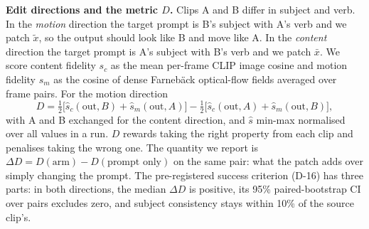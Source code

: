 \documentclass[twoside,english]{article}
\newcommand{\xs}{\bar{x}}         %
\newcommand{\xd}{\tilde{x}}       %
\newcommand{\dD}{\Delta D}
\begin{document}
\textbf{Edit directions and the metric $D$.} Clips A and B differ in subject and verb. In the
\emph{motion} direction the target prompt is B's subject with A's verb and we patch $\xd$, so the
output should look like B and move like A. In the \emph{content} direction the target prompt is
A's subject with B's verb and we patch $\xs$. We score content fidelity $s_c$ as the mean
per-frame CLIP image cosine \citep{radford2021clip} and motion fidelity $s_m$ as the cosine of
dense Farneb\"ack optical-flow fields \citep{farneback2003} averaged over frame pairs. For the motion
direction
\begin{equation}
D = \tfrac12\big[\hat s_c(\text{out},B) + \hat s_m(\text{out},A)\big] - \tfrac12\big[\hat s_c(\text{out},A) + \hat s_m(\text{out},B)\big],
\end{equation}
with A and B exchanged for the content direction, and $\hat s$ min-max normalised over all values
in a run. $D$ rewards taking the right property from each clip and penalises taking the wrong one.
The quantity we report is $\dD = D(\text{arm}) - D(\text{prompt only})$ on the same pair: what the
patch adds over simply changing the prompt. The pre-registered success criterion (D-16) has three
parts: in both directions, the median $\dD$ is positive, its 95\% paired-bootstrap CI over pairs
excludes zero, and subject consistency stays within 10\% of the source clip's.
\end{document}
